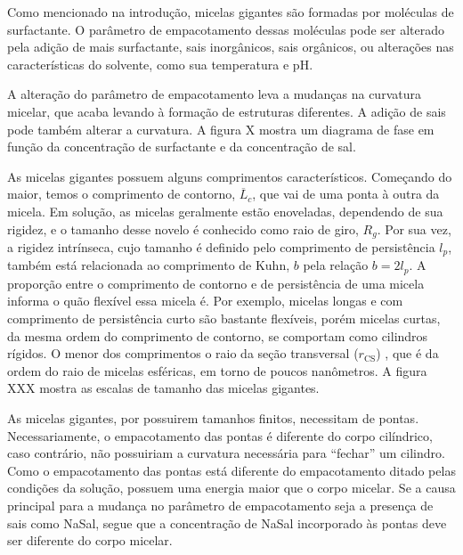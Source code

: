 		Como mencionado na introdução, micelas gigantes são formadas por moléculas de surfactante. O parâmetro de empacotamento dessas moléculas pode ser alterado pela adição de mais surfactante, sais inorgânicos, sais orgânicos, ou alterações nas características do solvente, como sua temperatura e pH. %
		
		A alteração do parâmetro de empacotamento leva a mudanças na curvatura micelar, que acaba levando à formação de estruturas diferentes. A adição de sais pode também alterar a curvatura. A figura X mostra um diagrama de fase em função da concentração de surfactante e da concentração de sal.
		
		
		As micelas gigantes possuem alguns comprimentos característicos. Começando do maior, temos o comprimento de contorno, \(\overline{L}_c\), que vai de uma ponta à outra da micela. Em solução, as micelas geralmente estão enoveladas, dependendo de sua rigidez, e o tamanho desse novelo é conhecido como raio de giro, \(R_g\).  Por sua vez, a rigidez intrínseca, cujo tamanho é definido pelo comprimento de persistência \(l_p\), também está relacionada ao comprimento de Kuhn, \(b\) pela relação \(b=2l_p\). A proporção entre o comprimento de contorno e de persistência de uma micela informa o quão flexível essa micela é. Por exemplo, micelas longas e com comprimento de persistência curto são bastante flexíveis, porém micelas curtas, da mesma ordem do comprimento de contorno, se comportam como cilindros rígidos. O menor dos comprimentos o raio da seção transversal (\(r_{\mathrm{CS}}\)) , que é da ordem do raio de micelas esféricas, em torno de poucos nanômetros. A figura XXX mostra as escalas de tamanho das micelas gigantes.
		
		
		As micelas gigantes, por possuirem tamanhos finitos, necessitam de pontas. Necessariamente, o empacotamento das pontas é diferente do corpo cilíndrico, caso contrário, não possuiriam a curvatura necessária para ``fechar'' um cilindro. Como o empacotamento das pontas está diferente do empacotamento ditado pelas condições da solução, possuem uma energia maior que o corpo micelar. Se a causa principal para a mudança no parâmetro de empacotamento seja a presença de sais como NaSal, segue que a concentração de NaSal incorporado às pontas deve ser diferente do corpo micelar. %
				
